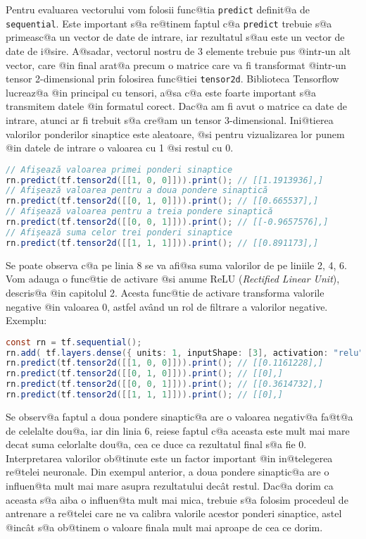 Pentru evaluarea vectorului vom folosii func@tia \texttt{predict} definit@a de \texttt{sequential}. Este important s@a re@tinem faptul c@a \texttt{predict} trebuie s@a primeasc@a un vector de date de intrare, iar rezultatul s@au este un vector de date de i@sire. A@sadar, vectorul nostru de 3 elemente trebuie pus @intr-un alt vector, care @in final arat@a precum o matrice care va fi transformat @intr-un tensor 2-dimensional prin folosirea func@tiei \texttt{tensor2d}. Biblioteca Tensorflow lucreaz@a @in principal cu tensori, a@sa c@a este foarte important s@a transmitem datele @in formatul corect. Dac@a am fi avut o matrice ca date de intrare, atunci ar fi trebuit s@a cre@am un tensor 3-dimensional.
Ini@tierea valorilor ponderilor sinaptice este aleatoare, @si pentru vizualizarea lor punem @in datele de intrare o valoarea cu 1 @si restul cu 0.

\begin{lstlisting}[language=Java, caption={Exemplu de evaluare a unei simple re@tele neuronale}]
// Afișează valoarea primei ponderi sinaptice
rn.predict(tf.tensor2d([[1, 0, 0]])).print(); // [[1.1913936],]
// Afișează valoarea pentru a doua pondere sinaptică
rn.predict(tf.tensor2d([[0, 1, 0]])).print(); // [[0.665537],]
// Afișează valoarea pentru a treia pondere sinaptică
rn.predict(tf.tensor2d([[0, 0, 1]])).print(); // [[-0.9657576],]
// Afișează suma celor trei ponderi sinaptice 
rn.predict(tf.tensor2d([[1, 1, 1]])).print(); // [[0.891173],]
\end{lstlisting}

Se poate observa c@a pe linia 8 se va afi@sa suma valorilor de pe liniile 2, 4, 6. Vom adauga o func@tie de activare @si anume ReLU (\textsl{Rectified Linear Unit}), descris@a @in capitolul 2. Acesta func@tie de activare transforma valorile negative @in valoarea 0, astfel av\^ and un rol de filtrare a valorilor negative. Exemplu:

\begin{lstlisting}[language=Java, caption={Exemplu de evaluare a unei simple rețele neuronale cu funcție de activare}]
const rn = tf.sequential();
rn.add( tf.layers.dense({ units: 1, inputShape: [3], activation: "relu", useBias: false }) );
rn.predict(tf.tensor2d([[1, 0, 0]])).print(); // [[0.1161228],] 
rn.predict(tf.tensor2d([[0, 1, 0]])).print(); // [[0],]
rn.predict(tf.tensor2d([[0, 0, 1]])).print(); // [[0.3614732],]
rn.predict(tf.tensor2d([[1, 1, 1]])).print(); // [[0],]
\end{lstlisting}

Se observ@a faptul a doua pondere sinaptic@a are o valoarea negativ@a fa@t@a de celelalte dou@a, iar din linia 6, reiese faptul c@a aceasta este mult mai mare decat suma celorlalte dou@a, cea ce duce ca rezultatul final s@a fie 0. Interpretarea valorilor ob@tinute este un factor important @in in@telegerea re@telei neuronale. Din exempul anterior, a doua pondere sinaptic@a are o influen@ta mult mai mare asupra rezultatului dec\^ at restul. Dac@a dorim ca aceasta s@a aiba o influen@ta mult mai mica, trebuie s@a folosim procedeul de antrenare a re@telei care ne va calibra valorile acestor ponderi sinaptice, astel @inc\^ at s@a ob@tinem o valoare finala mult mai aproape de cea ce dorim.

